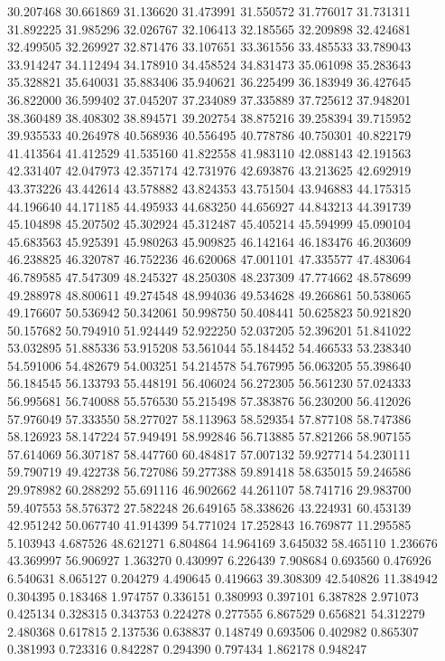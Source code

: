 30.207468
30.661869
31.136620
31.473991
31.550572
31.776017
31.731311
31.892225
31.985296
32.026767
32.106413
32.185565
32.209898
32.424681
32.499505
32.269927
32.871476
33.107651
33.361556
33.485533
33.789043
33.914247
34.112494
34.178910
34.458524
34.831473
35.061098
35.283643
35.328821
35.640031
35.883406
35.940621
36.225499
36.183949
36.427645
36.822000
36.599402
37.045207
37.234089
37.335889
37.725612
37.948201
38.360489
38.408302
38.894571
39.202754
38.875216
39.258394
39.715952
39.935533
40.264978
40.568936
40.556495
40.778786
40.750301
40.822179
41.413564
41.412529
41.535160
41.822558
41.983110
42.088143
42.191563
42.331407
42.047973
42.357174
42.731976
42.693876
43.213625
42.692919
43.373226
43.442614
43.578882
43.824353
43.751504
43.946883
44.175315
44.196640
44.171185
44.495933
44.683250
44.656927
44.843213
44.391739
45.104898
45.207502
45.302924
45.312487
45.405214
45.594999
45.090104
45.683563
45.925391
45.980263
45.909825
46.142164
46.183476
46.203609
46.238825
46.320787
46.752236
46.620068
47.001101
47.335577
47.483064
46.789585
47.547309
48.245327
48.250308
48.237309
47.774662
48.578699
49.288978
48.800611
49.274548
48.994036
49.534628
49.266861
50.538065
49.176607
50.536942
50.342061
50.998750
50.408441
50.625823
50.921820
50.157682
50.794910
51.924449
52.922250
52.037205
52.396201
51.841022
53.032895
51.885336
53.915208
53.561044
55.184452
54.466533
53.238340
54.591006
54.482679
54.003251
54.214578
54.767995
56.063205
55.398640
56.184545
56.133793
55.448191
56.406024
56.272305
56.561230
57.024333
56.995681
56.740088
55.576530
55.215498
57.383876
56.230200
56.412026
57.976049
57.333550
58.277027
58.113963
58.529354
57.877108
58.747386
58.126923
58.147224
57.949491
58.992846
56.713885
57.821266
58.907155
57.614069
56.307187
58.447760
60.484817
57.007132
59.927714
54.230111
59.790719
49.422738
56.727086
59.277388
59.891418
58.635015
59.246586
29.978982
60.288292
55.691116
46.902662
44.261107
58.741716
29.983700
59.407553
58.576372
27.582248
26.649165
58.338626
43.224931
60.453139
42.951242
50.067740
41.914399
54.771024
17.252843
16.769877
11.295585
5.103943
4.687526
48.621271
6.804864
14.964169
3.645032
58.465110
1.236676
43.369997
56.906927
1.363270
0.430997
6.226439
7.908684
0.693560
0.476926
6.540631
8.065127
0.204279
4.490645
0.419663
39.308309
42.540826
11.384942
0.304395
0.183468
1.974757
0.336151
0.380993
0.397101
6.387828
2.971073
0.425134
0.328315
0.343753
0.224278
0.277555
6.867529
0.656821
54.312279
2.480368
0.617815
2.137536
0.638837
0.148749
0.693506
0.402982
0.865307
0.381993
0.723316
0.842287
0.294390
0.797434
1.862178
0.948247
